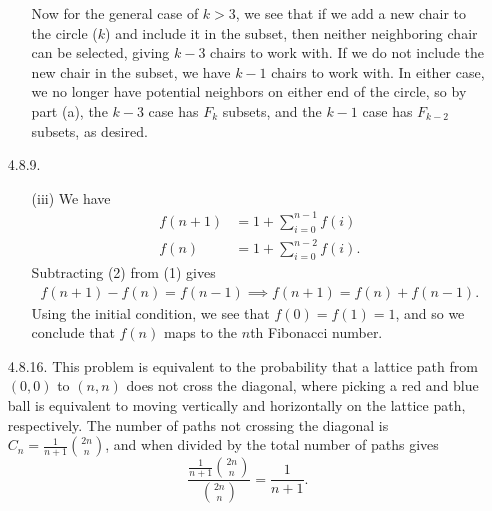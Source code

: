 \documentclass[11pt,letterpaper]{article}
\begin{document}
\begin{enumerate}
\begin{enumerate}
        Now for the general case of $k>3$, we see that if we add a new chair to the circle ($k$) and include it in the subset, then neither neighboring chair can be selected, giving $k-3$ chairs to work with. If we do not include the new chair in the subset, we have $k-1$ chairs to work with. In either case, we no longer have potential neighbors on either end of the circle, so by part (a), the $k-3$ case has $F_{k}$ subsets, and the $k-1$ case has $F_{k-2}$ subsets, as desired.
    \end{enumerate}
    \item[4.8.9.]
    \begin{enumerate}
        \item[(iii)] We have
        \begin{align}
            f(n+1) &= 1 + \sum_{i=0}^{n-1} f(i) \\
            f(n) &= 1 + \sum_{i=0}^{n-2} f(i).
        \end{align}
        Subtracting (2) from (1) gives
        \begin{align*}
            f(n+1)-f(n) = f(n-1)
            \implies f(n+1) = f(n) + f(n-1).
        \end{align*}
    Using the initial condition, we see that $f(0)=f(1)=1$, and so we conclude that $f(n)$ maps to the $n$th Fibonacci number.
    \end{enumerate}
    \item[4.8.16.]
    This problem is equivalent to the probability that a lattice path from $(0,0)$ to $(n,n)$ does not cross the diagonal, where picking a red and blue ball is equivalent to moving vertically and horizontally on the lattice path, respectively.
    The number of paths not crossing the diagonal is $C_n=\frac{1}{n+1}\binom{2n}{n}$, and when divided by the total number of paths gives
    \[
        \frac{\frac{1}{n+1}\binom{2n}{n}}{\binom{2n}{n}} = \frac{1}{n+1}.
    \]
\end{enumerate}
\end{document}

